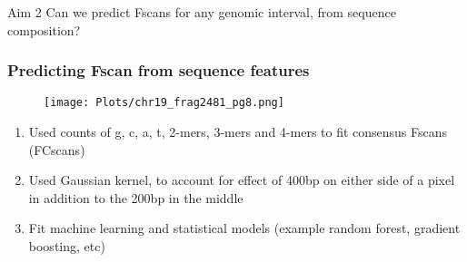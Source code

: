 \documentclass[10pt,dvipsnames,table]{beamer}
\begin{document}
\begin{frame}
\begin{block}{Aim 2}
Can we predict Fscans for any genomic interval, from sequence composition?
\end{block}
\end{frame}

\begin{frame}
\frametitle{Predicting Fscan from sequence features}
\begin{figure}
\centering
\texttt{[image: Plots/chr19\_frag2481\_pg8.png]}
\end{figure}
\begin{enumerate}
\item Used counts of g, c, a, t, 2-mers, 3-mers and 4-mers to fit consensus Fscans (FCscans)
\item Used Gaussian kernel, to account for effect of 400bp on either side of a pixel in addition to the 200bp in the middle
\item Fit machine learning and statistical models (example random forest, gradient boosting, etc)
\end{enumerate}

\end{frame}
\end{document}
